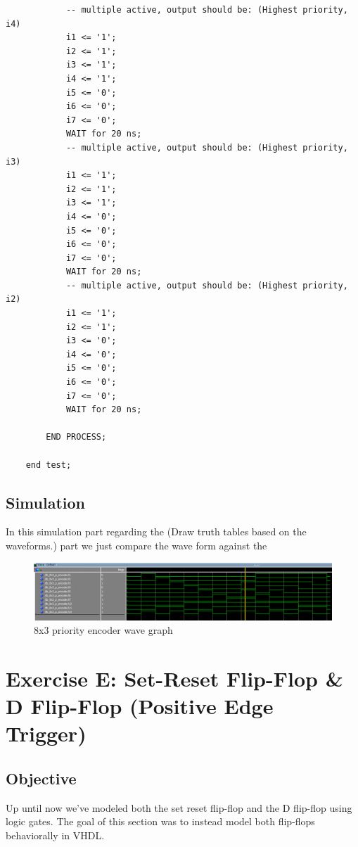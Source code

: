 \documentclass[12pt]{article}
\begin{document}
\begin{verbatim}
            -- multiple active, output should be: (Highest priority, i4)
            i1 <= '1';
            i2 <= '1';
            i3 <= '1';
            i4 <= '1';
            i5 <= '0';
            i6 <= '0';
            i7 <= '0';
            WAIT for 20 ns;
            -- multiple active, output should be: (Highest priority, i3)
            i1 <= '1';
            i2 <= '1';
            i3 <= '1';
            i4 <= '0';
            i5 <= '0';
            i6 <= '0';
            i7 <= '0';
            WAIT for 20 ns;
            -- multiple active, output should be: (Highest priority, i2)
            i1 <= '1';
            i2 <= '1';
            i3 <= '0';
            i4 <= '0';
            i5 <= '0';
            i6 <= '0';
            i7 <= '0';
            WAIT for 20 ns;

        END PROCESS;

    end test;

\end{verbatim}


\subsection{Simulation}
In this simulation part regarding the (Draw truth tables based on the waveforms.) part we just compare the wave form against the
\begin{figure}[h]
\caption{8x3 priority encoder wave graph}
\centering
\includegraphics[width=\textwidth]{./diagrams/8x3_p_enc_simulation.png}
\end{figure}

\clearpage
\section{Exercise E: Set-Reset Flip-Flop \& D Flip-Flop (Positive Edge Trigger)}
\subsection{Objective}
Up until now we've modeled both the set reset flip-flop and the D flip-flop using logic gates. The goal of this section was to instead model both flip-flops behaviorally in VHDL.
\end{document}
